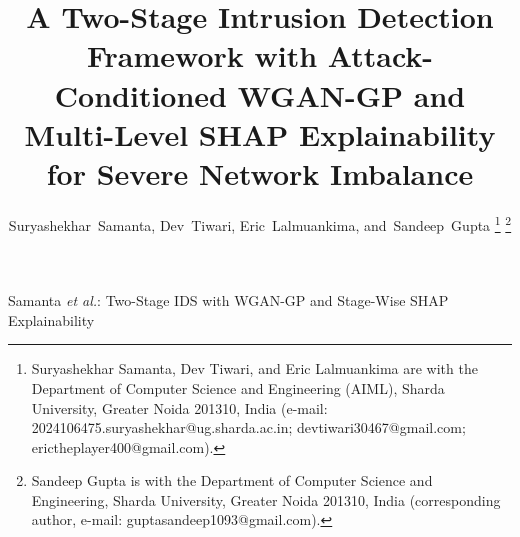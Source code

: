 \documentclass[journal]{IEEEtran}
\begin{document}
\title{A Two-Stage Intrusion Detection Framework with Attack-Conditioned WGAN-GP and Multi-Level SHAP Explainability for Severe Network Imbalance}

\author{Suryashekhar~Samanta,
        Dev~Tiwari,
        Eric~Lalmuankima,
        and~Sandeep~Gupta%
\thanks{Suryashekhar Samanta, Dev Tiwari, and Eric Lalmuankima are with the Department of Computer Science and Engineering (AIML), Sharda University, Greater Noida 201310, India (e-mail: 2024106475.suryashekhar@ug.sharda.ac.in; devtiwari30467@gmail.com; erictheplayer400@gmail.com).}
\thanks{Sandeep Gupta is with the Department of Computer Science and Engineering, Sharda University, Greater Noida 201310, India (corresponding author, e-mail: guptasandeep1093@gmail.com).}}

\markboth{}%
{Samanta \MakeLowercase{\textit{et al.}}: Two-Stage IDS with WGAN-GP and Stage-Wise SHAP Explainability}

\maketitle
\end{document}
